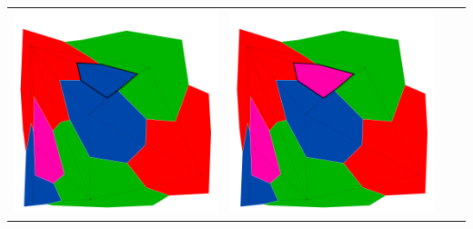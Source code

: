 \documentclass[10pt,a4paper]{article}
\begin{document}
\begin{tabular}{c c c c }
	\includegraphics[scale=.10]{../results/backtracking_simple/map_build/bt_simple_I00019.pdf}&
	\includegraphics[scale=.10]{../results/backtracking_simple/map_build/bt_simple_I00020.pdf}\\
	
	
\end{tabular}
\end{document}
